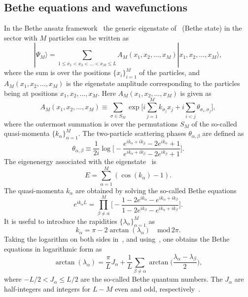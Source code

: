 \documentclass[11pt]{iopart}
\begin{document}
\subsection{Bethe equations and wavefunctions}
\label{sec:1.2}


In the Bethe ansatz framework~\cite{bethe-1931,taka-book} the generic eigenstate 
of~ (Bethe state) in the sector with $M$ particles can be written as 
%
\begin{equation}
\label{ba-eig}
|\Psi_M\rangle=\sum\limits_{1\le x_1<x_2<\dots<x_M\le L}A_M(x_1,x_2,
\dots,x_M)|x_1,x_2,\dots,x_M\rangle,
\end{equation}
%
where the sum is over the positions $\{x_i\}_{i=1}^M$ of the particles, and $A_M(x_1,
x_2,\dots,x_M)$ is the eigenstate amplitude corresponding to the particles 
being at positions $x_1,x_2,\dots, x_M$. Here $A_M(x_1,x_2,\dots, x_M)$ is 
given as 
%
\begin{equation}
\label{ba_amp}
A_M(x_1,x_2,\dots,x_M)\equiv\sum\limits_{\sigma\in S_M}\exp\Big[i
\sum\limits_{j=1}^Mk_{\sigma_j}x_j+i\sum\limits_{i<j}\theta_{\sigma_i,\sigma_j}
\Big], 
\end{equation}
%
where the outermost summation is over the permutations $S_M$ of the so-called 
quasi-momenta $\{k_\alpha\}_{\alpha=1}^M$. The two-particle scattering phases 
$\theta_{\alpha,\beta}$ are defined as 
%
\begin{equation}
\label{s_phases}
\theta_{\alpha,\beta}\equiv \frac{1}{2i}\log\Big[-\frac{e^{ik_\alpha+ik_\beta}-
2e^{ik_\alpha}+1}{e^{ik_\alpha+ik_\beta}-2e^{ik_\beta}+1}\Big].
\end{equation}
%
The eigenenergy associated with the eigenstate~ is  
%
\begin{equation}
\label{ba-ener}
E=\sum\limits_{\alpha=1}^M(\cos(k_\alpha)-1). 
\end{equation}
%
The quasi-momenta $k_\alpha$ are obtained by solving the so-called Bethe 
equations~\cite{bethe-1931}
%
\begin{equation}
\label{ba-eq}
e^{ik_\alpha L}=\prod\limits^M_{\beta\ne\alpha}\Big[-\frac{1-2e^{
ik_\alpha}-e^{ik_\alpha+ik_\beta}}{1-2e^{ik_\beta}-e^{ik_\alpha+
ik_\beta}}\Big].
\end{equation}
%
It is useful to  introduce the rapidities $\{\lambda_\alpha\}_{\alpha=1}^M$ as 
%
\begin{equation}
\label{rap}
k_\alpha=\pi-2\arctan(\lambda_\alpha)\quad\mbox{mod}\, 2\pi.
\end{equation}
%
Taking the logarithm on both sides in~, and using~, 
one obtains the Bethe equations in logarithmic form as 
%
\begin{equation}
\label{ba-eq-log}
\arctan(\lambda_\alpha)=\frac{\pi}{L}J_\alpha+\frac{1}{L}\sum\limits_{
\beta\ne\alpha}\arctan\Big(\frac{\lambda_\alpha-\lambda_\beta}{2}\Big),
\end{equation}
%
where $-L/2<J_\alpha\le L/2$ are the so-called Bethe quantum numbers. The 
$J_\alpha$ are half-integers and integers for $L-M$ even and odd, 
respectively~\cite{taka-book}. 
\end{document}
